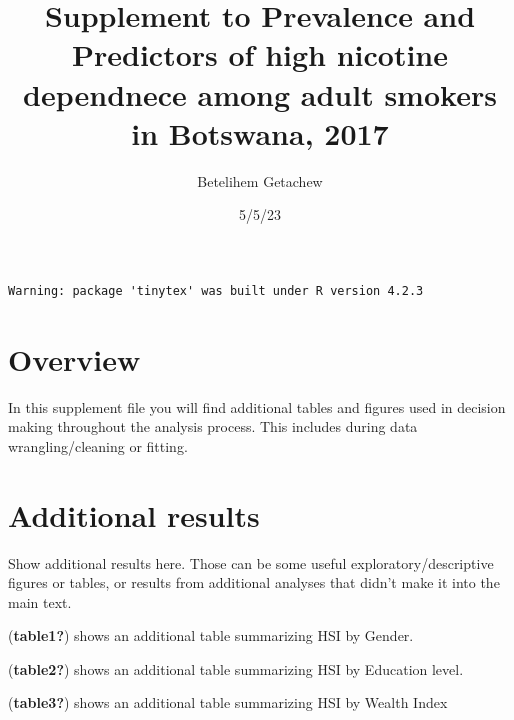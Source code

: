 \documentclass[
  letterpaper,
  DIV=11,
  numbers=noendperiod]{scrartcl}
\title{Supplement to Prevalence and Predictors of high nicotine
dependnece among adult smokers in Botswana, 2017}
\author{Betelihem Getachew}
\date{5/5/23}
\begin{document}
\maketitle
\ifdefined\Shaded\renewenvironment{Shaded}{\begin{tcolorbox}[breakable, boxrule=0pt, frame hidden, interior hidden, borderline west={3pt}{0pt}{shadecolor}, enhanced, sharp corners]}{\end{tcolorbox}}\fi

\begin{verbatim}
Warning: package 'tinytex' was built under R version 4.2.3
\end{verbatim}

\hypertarget{overview}{%
\section{Overview}\label{overview}}

In this supplement file you will find additional tables and figures used
in decision making throughout the analysis process. This includes during
data wrangling/cleaning or fitting.

\hypertarget{additional-results}{%
\section{Additional results}\label{additional-results}}

Show additional results here. Those can be some useful
exploratory/descriptive figures or tables, or results from additional
analyses that didn't make it into the main text.

(\textbf{table1?}) shows an additional table summarizing HSI by Gender.

\begin{table}

\end{table}

(\textbf{table2?}) shows an additional table summarizing HSI by
Education level.

\begin{table}

\end{table}

(\textbf{table3?}) shows an additional table summarizing HSI by Wealth
Index

\begin{table}

\end{table}
\end{document}
